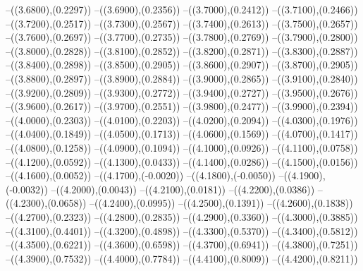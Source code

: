 {	--({\sx*(3.6800)},{\sy*(0.2297)})
	--({\sx*(3.6900)},{\sy*(0.2356)})
	--({\sx*(3.7000)},{\sy*(0.2412)})
	--({\sx*(3.7100)},{\sy*(0.2466)})
	--({\sx*(3.7200)},{\sy*(0.2517)})
	--({\sx*(3.7300)},{\sy*(0.2567)})
	--({\sx*(3.7400)},{\sy*(0.2613)})
	--({\sx*(3.7500)},{\sy*(0.2657)})
	--({\sx*(3.7600)},{\sy*(0.2697)})
	--({\sx*(3.7700)},{\sy*(0.2735)})
	--({\sx*(3.7800)},{\sy*(0.2769)})
	--({\sx*(3.7900)},{\sy*(0.2800)})
	--({\sx*(3.8000)},{\sy*(0.2828)})
	--({\sx*(3.8100)},{\sy*(0.2852)})
	--({\sx*(3.8200)},{\sy*(0.2871)})
	--({\sx*(3.8300)},{\sy*(0.2887)})
	--({\sx*(3.8400)},{\sy*(0.2898)})
	--({\sx*(3.8500)},{\sy*(0.2905)})
	--({\sx*(3.8600)},{\sy*(0.2907)})
	--({\sx*(3.8700)},{\sy*(0.2905)})
	--({\sx*(3.8800)},{\sy*(0.2897)})
	--({\sx*(3.8900)},{\sy*(0.2884)})
	--({\sx*(3.9000)},{\sy*(0.2865)})
	--({\sx*(3.9100)},{\sy*(0.2840)})
	--({\sx*(3.9200)},{\sy*(0.2809)})
	--({\sx*(3.9300)},{\sy*(0.2772)})
	--({\sx*(3.9400)},{\sy*(0.2727)})
	--({\sx*(3.9500)},{\sy*(0.2676)})
	--({\sx*(3.9600)},{\sy*(0.2617)})
	--({\sx*(3.9700)},{\sy*(0.2551)})
	--({\sx*(3.9800)},{\sy*(0.2477)})
	--({\sx*(3.9900)},{\sy*(0.2394)})
	--({\sx*(4.0000)},{\sy*(0.2303)})
	--({\sx*(4.0100)},{\sy*(0.2203)})
	--({\sx*(4.0200)},{\sy*(0.2094)})
	--({\sx*(4.0300)},{\sy*(0.1976)})
	--({\sx*(4.0400)},{\sy*(0.1849)})
	--({\sx*(4.0500)},{\sy*(0.1713)})
	--({\sx*(4.0600)},{\sy*(0.1569)})
	--({\sx*(4.0700)},{\sy*(0.1417)})
	--({\sx*(4.0800)},{\sy*(0.1258)})
	--({\sx*(4.0900)},{\sy*(0.1094)})
	--({\sx*(4.1000)},{\sy*(0.0926)})
	--({\sx*(4.1100)},{\sy*(0.0758)})
	--({\sx*(4.1200)},{\sy*(0.0592)})
	--({\sx*(4.1300)},{\sy*(0.0433)})
	--({\sx*(4.1400)},{\sy*(0.0286)})
	--({\sx*(4.1500)},{\sy*(0.0156)})
	--({\sx*(4.1600)},{\sy*(0.0052)})
	--({\sx*(4.1700)},{\sy*(-0.0020)})
	--({\sx*(4.1800)},{\sy*(-0.0050)})
	--({\sx*(4.1900)},{\sy*(-0.0032)})
	--({\sx*(4.2000)},{\sy*(0.0043)})
	--({\sx*(4.2100)},{\sy*(0.0181)})
	--({\sx*(4.2200)},{\sy*(0.0386)})
	--({\sx*(4.2300)},{\sy*(0.0658)})
	--({\sx*(4.2400)},{\sy*(0.0995)})
	--({\sx*(4.2500)},{\sy*(0.1391)})
	--({\sx*(4.2600)},{\sy*(0.1838)})
	--({\sx*(4.2700)},{\sy*(0.2323)})
	--({\sx*(4.2800)},{\sy*(0.2835)})
	--({\sx*(4.2900)},{\sy*(0.3360)})
	--({\sx*(4.3000)},{\sy*(0.3885)})
	--({\sx*(4.3100)},{\sy*(0.4401)})
	--({\sx*(4.3200)},{\sy*(0.4898)})
	--({\sx*(4.3300)},{\sy*(0.5370)})
	--({\sx*(4.3400)},{\sy*(0.5812)})
	--({\sx*(4.3500)},{\sy*(0.6221)})
	--({\sx*(4.3600)},{\sy*(0.6598)})
	--({\sx*(4.3700)},{\sy*(0.6941)})
	--({\sx*(4.3800)},{\sy*(0.7251)})
	--({\sx*(4.3900)},{\sy*(0.7532)})
	--({\sx*(4.4000)},{\sy*(0.7784)})
	--({\sx*(4.4100)},{\sy*(0.8009)})
	--({\sx*(4.4200)},{\sy*(0.8211)})
}
